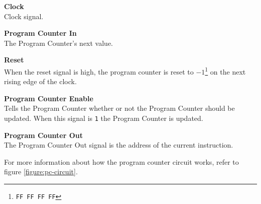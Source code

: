 \begin{description}
\item{\textbf{Clock}} \\
Clock signal.

\item{\textbf{Program Counter In}} \\
The Program Counter's next value.

\item{\textbf{Reset}} \\
When the reset signal is high, the program counter is reset to $-1$\footnote{\texttt{FF FF FF FF}} on the next rising edge of the clock.

\item{\textbf{Program Counter Enable}} \\
Tells the Program Counter whether or not the Program Counter should be updated.
When this signal is \texttt{1} the Program Counter is updated.

\end{description}


\begin{description}
\item{\textbf{Program Counter Out}} \\
The Program Counter Out signal is the address of the current instruction.

\end{description}

For more information about how the program counter circuit works, refer to figure \vref{figure:pc-circuit}.
